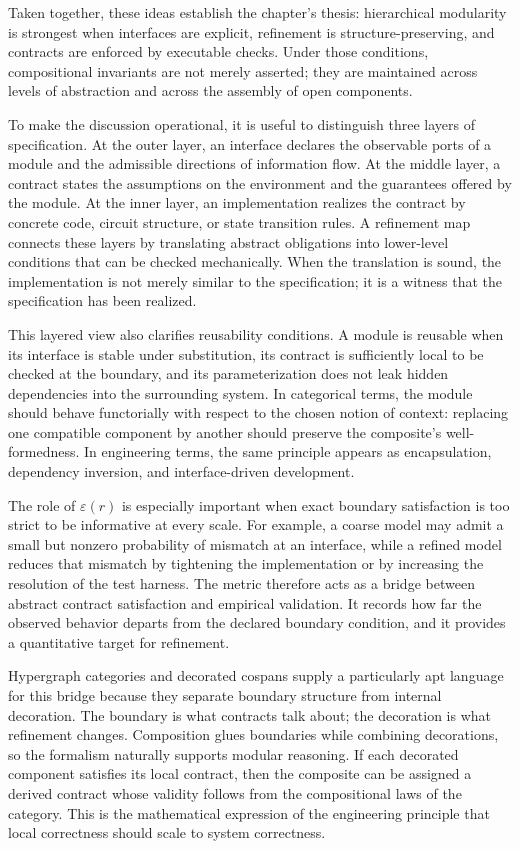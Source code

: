 Taken together, these ideas establish the chapter’s thesis: hierarchical modularity is strongest when interfaces are explicit, refinement is structure-preserving, and contracts are enforced by executable checks. Under those conditions, compositional invariants are not merely asserted; they are maintained across levels of abstraction and across the assembly of open components.

To make the discussion operational, it is useful to distinguish three layers of specification. At the outer layer, an interface declares the observable ports of a module and the admissible directions of information flow. At the middle layer, a contract states the assumptions on the environment and the guarantees offered by the module. At the inner layer, an implementation realizes the contract by concrete code, circuit structure, or state transition rules. A refinement map connects these layers by translating abstract obligations into lower-level conditions that can be checked mechanically. When the translation is sound, the implementation is not merely similar to the specification; it is a witness that the specification has been realized.

This layered view also clarifies reusability conditions. A module is reusable when its interface is stable under substitution, its contract is sufficiently local to be checked at the boundary, and its parameterization does not leak hidden dependencies into the surrounding system. In categorical terms, the module should behave functorially with respect to the chosen notion of context: replacing one compatible component by another should preserve the composite’s well-formedness. In engineering terms, the same principle appears as encapsulation, dependency inversion, and interface-driven development.

The role of \(\varepsilon(r)\) is especially important when exact boundary satisfaction is too strict to be informative at every scale. For example, a coarse model may admit a small but nonzero probability of mismatch at an interface, while a refined model reduces that mismatch by tightening the implementation or by increasing the resolution of the test harness. The metric therefore acts as a bridge between abstract contract satisfaction and empirical validation. It records how far the observed behavior departs from the declared boundary condition, and it provides a quantitative target for refinement.

Hypergraph categories and decorated cospans supply a particularly apt language for this bridge because they separate boundary structure from internal decoration. The boundary is what contracts talk about; the decoration is what refinement changes. Composition glues boundaries while combining decorations, so the formalism naturally supports modular reasoning. If each decorated component satisfies its local contract, then the composite can be assigned a derived contract whose validity follows from the compositional laws of the category. This is the mathematical expression of the engineering principle that local correctness should scale to system correctness.


